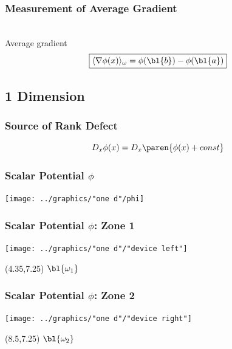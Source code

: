 \documentclass[handout]{beamer}
\begin{document}
\begin{frame}      %
\frametitle{Measurement of Average Gradient}
	 \\
  Average gradient \\
  $$\boxed{\langle \nabla \phi(x) \rangle_{\omega} = \phi(\bl{b}) - \phi(\bl{a})}$$
\end{frame}

\subsection{1 Dimension}

\begin{frame}      %
\frametitle{Source of Rank Defect}
  $$D_{x} \phi(x) = D_{x} \paren{\phi(x) + const}$$
\end{frame}

\begin{frame}      %
\frametitle{Scalar Potential $\phi$}
  \begin{center}
    \texttt{[image: ../graphics/"one d"/phi]}
  \end{center}
\end{frame}

\begin{frame}      %
\frametitle{Scalar Potential $\phi$: Zone 1}
  \begin{center}
    \texttt{[image: ../graphics/"one d"/"device left"]}
  \end{center}
  \begin{textblock}{2.75}(4.35,7.25)
    $\bl{\omega_{1}}$
  \end{textblock}
\end{frame}

\begin{frame}      %
\frametitle{Scalar Potential $\phi$: Zone 2}
  \begin{center}
    \texttt{[image: ../graphics/"one d"/"device right"]}
  \end{center}
  \begin{textblock}{2.75}(8.5,7.25)
    $\bl{\omega_{2}}$
  \end{textblock}
\end{frame}
\end{document}
